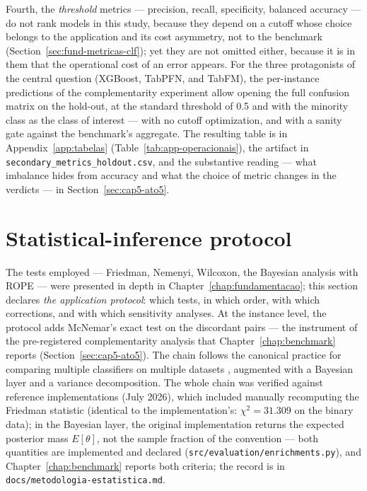 Fourth, the \emph{threshold} metrics --- precision, recall,
specificity, balanced accuracy --- do not rank models in this study,
because they depend on a cutoff whose choice belongs to the
application and its cost asymmetry, not to the benchmark
(Section~\ref{sec:fund-metricas-clf}); yet they are not omitted
either, because it is in them that the operational cost of an error
appears. For the three protagonists of the central question
(XGBoost, TabPFN, and TabFM), the per-instance predictions of the
complementarity experiment allow opening the full confusion matrix
on the hold-out, at the standard threshold of 0.5 and with the
minority class as the class of interest --- with no cutoff
optimization, and with a sanity gate against the benchmark's
aggregate. The resulting table is in Appendix~\ref{app:tabelas}
(Table~\ref{tab:app-operacionais}), the artifact in
\texttt{secondary\_\allowbreak metrics\_\allowbreak holdout.csv}, and
the substantive reading --- what imbalance hides from accuracy and
what the choice of metric changes in the verdicts --- in
Section~\ref{sec:cap5-ato5}.

\section{Statistical-inference protocol}
\label{sec:met-estatistica}

The tests employed --- Friedman, Nemenyi, Wilcoxon, the Bayesian
analysis with ROPE --- were presented in depth in
Chapter~\ref{chap:fundamentacao}; this section declares \emph{the
application protocol}: which tests, in which order, with which
corrections, and with which sensitivity analyses. At the instance
level, the protocol adds McNemar's exact test on the discordant pairs
\citep{mcnemar1947} --- the instrument of the pre-registered
complementarity analysis that Chapter~\ref{chap:benchmark} reports
(Section~\ref{sec:cap5-ato5}). The chain follows the canonical
practice for comparing multiple classifiers on multiple datasets
\citep{demsar2006, benavoli2017}, augmented with a Bayesian layer
and a variance decomposition. The whole chain was verified against
reference implementations (July 2026), which included manually
recomputing the Friedman statistic (identical to the
implementation's: $\chi^2 = 31.309$ on the binary data); in the
Bayesian layer, the original implementation returns the expected
posterior mass $E[\theta]$, not the sample fraction of the
\citet{benavoli2017} convention --- both quantities are implemented
and declared (\texttt{src/evaluation/enrichments.py}), and
Chapter~\ref{chap:benchmark} reports both criteria; the record is in
\texttt{docs/\allowbreak metodologia-\allowbreak estatistica.\allowbreak md}.

